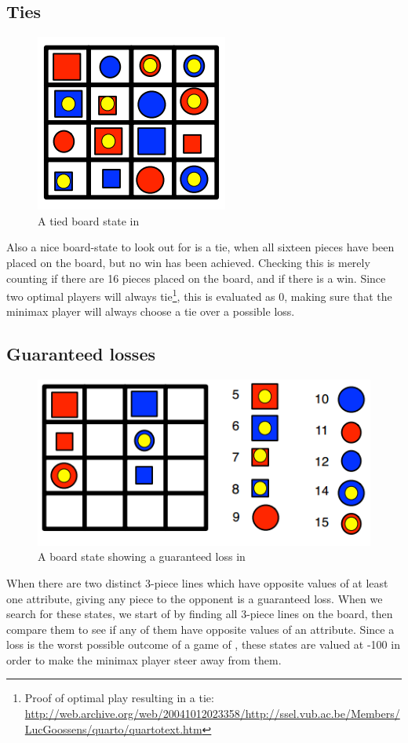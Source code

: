 \subsection{Ties}
\begin{figure}[htb]
\label{fig: tie}
\includegraphics{pictures/tie.png}
\caption[A tie in \quarto{}]{A tied board state in \quarto{}}
\end{figure}
Also a nice board-state to look out for is a tie, when all sixteen pieces have  been placed on the board, but no win has been achieved. Checking this is merely counting if there are 16 pieces placed on the board, and if there is a  win. Since two optimal players will always tie\footnote{Proof of optimal play resulting in a tie: \url{http://web.archive.org/web/20041012023358/http://ssel.vub.ac.be/Members/LucGoossens/quarto/quartotext.htm}}, this is evaluated as 0, making sure that the minimax player will always choose a tie over a possible loss.

\subsection{Guaranteed losses}
\begin{figure}[htb]
\label{fig: gloss}
\includegraphics{pictures/gloss.png}
\caption[A guaranteed loss in \quarto{}]{A board state showing a guaranteed loss in \quarto{}}
\end{figure}
When there are two distinct 3-piece lines which have opposite values of at least one attribute, giving any piece to the opponent is a  guaranteed loss.
When we search for these states, we start of by finding all 3-piece lines on the board, then compare them to see if any of them have opposite values of an attribute.
Since a loss is the worst possible outcome of a game of \quarto{}, these states are valued at -100 in order to make the minimax player steer away from them.

